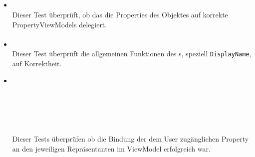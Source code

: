 \subsection{}

\paragraph{}

\begin{itemize}

\item{}~\\
Dieser Test überprüft, ob das  die Properties des Objektes auf korrekte PropertyViewModels delegiert.

\end{itemize}

\paragraph{}

\begin{itemize}

	\item {} \\
	Dieser Test überprüft die allgemeinen Funktionen des s, speziell \verb#DisplayName#, auf Korrektheit.
	\item {} \\
	 \\
	 \\
	 \\
	 \\
	 \\
	Dieser Tests überprüfen ob die Bindung der dem User zugänglichen Property an den jeweiligen Repräsentanten im ViewModel erfolgreich war.

\end{itemize}

